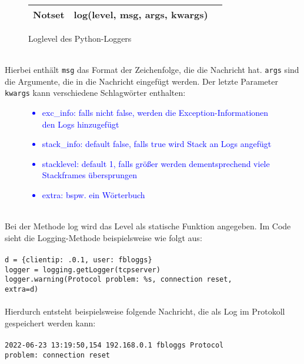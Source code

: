 {\begin{figure}[h]
{\begin{tabular}[h]{|p{1.5cm}|p{5cm}|p{6cm}|}
                \hline
                Notset   & log(level, msg, args, kwargs) &                                                                                \\
                \hline
            \end{tabular}\caption{Loglevel des Python-Loggers}\label{fig:figure2}}
    \end{figure}
    \\
    Hierbei enthält \texttt{msg} das Format der Zeichenfolge, die die Nachricht hat.
    \texttt{args} sind die Argumente, die in die Nachricht eingefügt werden.
    Der letzte Parameter \texttt{kwargs} kann verschiedene Schlagwörter enthalten:
    \begin{figure}[h]
        \centering
        \textcolor{blue}{
            \begin{itemize}
                \item exc\_info: falls nicht false, werden die Exception-Informationen den Logs hinzugefügt
                \item stack\_info: default false, falls true wird Stack an Logs angefügt
                \item stacklevel: default 1, falls größer werden dementsprechend viele Stackframes übersprungen
                \item extra: bspw.
                ein Wörterbuch
            \end{itemize}
            \label{fig:}}
    \end{figure}
    \\
    Bei der Methode log wird das Level als statische Funktion angegeben.
    Im Code sieht die Logging-Methode beispielsweise wie folgt aus:
    \\
    \\
    \hspace*{10mm}
    \texttt{d = \{\textquotesingle clientip\textquotesingle : .0.1\textquotesingle, \textquotesingle user\textquotesingle: \textquotesingle fbloggs\textquotesingle \}}
    \\
    \hspace*{10mm}
    \texttt{logger = logging.getLogger(\textquotesingle tcpserver\textquotesingle )}
    \\
    \hspace*{10mm}
    \texttt{logger.warning(\textquotesingle Protocol problem: \%s\textquotesingle , \textquotesingle connection reset\textquotesingle ,
        \\
        \hspace*{30mm}
        extra=d)}
    \\
    \\
    Hierdurch entsteht beispielsweise folgende Nachricht, die als Log im Protokoll gespeichert werden kann:
    \\
    \\
    \hspace*{10mm}
    \texttt{2022-06-23 13:19:50,154 192.168.0.1 fbloggs Protocol
    \\
    \hspace*{30mm}
    problem: connection reset}
    \\
}\autocite{docs-python, ionos}

